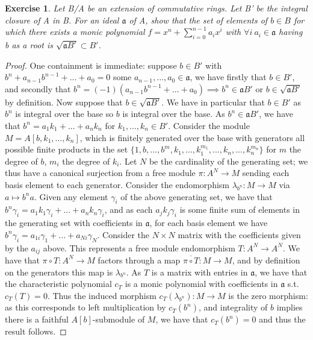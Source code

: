 \documentclass{article}
\newcommand{\fk}[1]{\mathfrak{#1}}
\newtheorem{exercise}{Exercise}
\begin{document}
\begin{exercise}
  Let B/A be an extension of commutative rings. Let B' be the integral closure of A in B. For an ideal $\fk{a}$ of A, show that the set of elements of $b \in B$ for which there exists a monic polynomial $f = x^{n} + \sum_{i=0}^{n-1}a_{i}x^{i}$ with $\forall i \ a_{i} \in \fk{a}$ having b as a root is $\sqrt{\fk{a}B'} \subset B'$.
\end{exercise}
\begin{proof}
  One containment is immediate: suppose $b \in B'$ with $b^{n} + a_{n-1}b^{n-1} + ... + a_{0} = 0$ some $a_{n-1},...,a_{0} \in \fk{a}$, we have firstly that $b \in B'$, and secondly that $b^{n} = (-1) (a_{n-1}b^{n-1} + ... + a_{0}) \implies b^{n}\in \fk{a}B'$ or $b \in \sqrt{\fk{a}B'}$ by definition. Now suppose that $b \in \sqrt{\fk{a}B'}$. We have in particular that $b \in B'$ as $b^{n}$ is integral over the base so $b$ is integral over the base. As $b^{n} \in \fk{a}B'$, we have that $b^{n} = a_{1}k_{1} + ... + a_{n}k_{n}$ for $k_{1},...,k_{n} \in B'$. Consider the module $M = A[b,k_{1},...,k_{n}]$, which is finitely generated over the base with generators all possible finite products in the set $\{1, b, ... , b^{m}, k_{1},...,k_{1}^{m_{1}},...,k_{n},...,k_{n}^{m_{n}}\}$ for $m$ the degree of $b$, $m_{i}$ the degree of $k_{i}$. Let $N$ be the cardinality of the generating set; we thus have a canonical surjection from a free module $\pi: A^{N} \to M$ sending each basis element to each generator. Consider the endomorphism $\lambda_{b^{n}}: M \to M$ via $a \mapsto b^{n}a$. Given any element $\gamma_{i}$ of the above generating set, we have that $b^{n}\gamma_{i} = a_{1}k_{1}\gamma_{i} + ... + a_{n}k_{n}\gamma_{i}$, and as each $a_{j}k_{j}\gamma_{i}$ is some finite sum of elements in the generating set with coefficients in $\fk{a}$, for each basis element we have $b^{n}\gamma_{i} = a_{1i}\gamma_{1} + ... + a_{Ni}\gamma_{N}$. Consider the $N \times N$ matrix with the coefficients given by the $a_{ij}$ above. This represents a free module endomorphism $T: A^{N}\to A^{N}$. We have that $\pi \circ T: A^{N} \to M$ factors through a map $\overline{\pi \circ T}: M \to M$, and by definition on the generators this map is $\lambda_{b^{n}}$. As $T$ is a matrix with entries in $\fk{a}$, we have that the characteristic polynomial $c_{T}$ is a monic polynomial with coefficients in $\fk{a}$ s.t. $c_{T}(T) = 0$. Thus the induced morphism $c_{T}(\lambda_{b^{n}}): M \to M$ is the zero morphism: as this corresponds to left multiplication by $c_{T}(b^{n})$, and integrality of $b$ implies there is a faithful $A[b]$-submodule of $M$, we have that $c_{T}(b^{n}) = 0$ and thus the result follows. 
\end{proof}
\newpage
\end{document}
